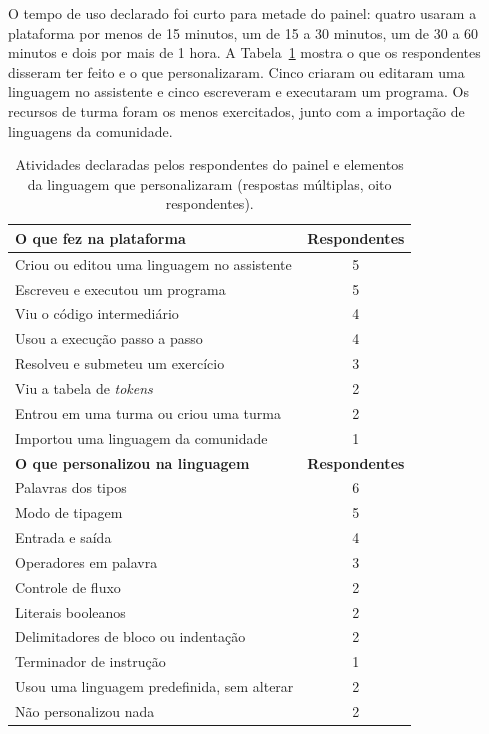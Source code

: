 O tempo de uso declarado foi curto para metade do painel: quatro usaram a plataforma por menos de 15 minutos, um de 15 a 30 minutos, um de 30 a 60 minutos e dois por mais de 1 hora. A Tabela~\ref{tab:resultado-atividades} mostra o que os respondentes disseram ter feito e o que personalizaram. Cinco criaram ou editaram uma linguagem no assistente e cinco escreveram e executaram um programa. Os recursos de turma foram os menos exercitados, junto com a importação de linguagens da comunidade.

\begin{table}[htbp]
\centering
\caption{Atividades declaradas pelos respondentes do painel e elementos da linguagem que personalizaram (respostas múltiplas, oito respondentes).}
\label{tab:resultado-atividades}
\footnotesize
\renewcommand{\arraystretch}{1.2}
\begin{tabular}{|p{10.5cm}|c|}
\hline
\textbf{O que fez na plataforma} & \textbf{Respondentes} \\\hline
Criou ou editou uma linguagem no assistente & 5 \\\hline
Escreveu e executou um programa & 5 \\\hline
Viu o código intermediário & 4 \\\hline
Usou a execução passo a passo & 4 \\\hline
Resolveu e submeteu um exercício & 3 \\\hline
Viu a tabela de \textit{tokens} & 2 \\\hline
Entrou em uma turma ou criou uma turma & 2 \\\hline
Importou uma linguagem da comunidade & 1 \\\hline
\textbf{O que personalizou na linguagem} & \textbf{Respondentes} \\\hline
Palavras dos tipos & 6 \\\hline
Modo de tipagem & 5 \\\hline
Entrada e saída & 4 \\\hline
Operadores em palavra & 3 \\\hline
Controle de fluxo & 2 \\\hline
Literais booleanos & 2 \\\hline
Delimitadores de bloco ou indentação & 2 \\\hline
Terminador de instrução & 1 \\\hline
Usou uma linguagem predefinida, sem alterar & 2 \\\hline
Não personalizou nada & 2 \\\hline
\end{tabular}
\end{table}

